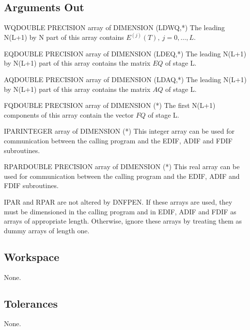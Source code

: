 \subsection{Arguments Out}

\begin{entry}{WQ}{DOUBLE PRECISION array of DIMENSION (LDWQ,*)}
    The leading N(L+1) by N part of this array contains
    $E^{(j)}(T),\ j=0,\dots,L$.
\end{entry}

\begin{entry}{EQ}{DOUBLE PRECISION array of DIMENSION (LDEQ,*)}
  The leading N(L+1) by N(L+1) part of this array contains the
  matrix $EQ$ of stage L.
\end{entry}

\begin{entry}{AQ}{DOUBLE PRECISION array of DIMENSION (LDAQ,*)}
  The leading N(L+1) by N(L+1) part of this array contains the
  matrix $AQ$ of stage L.
\end{entry}

\begin{entry}{FQ}{DOUBLE PRECISION array of DIMENSION (*)}
  The first N(L+1) components of this array contain the vector
  $FQ$ of stage L.
\end{entry}

\begin{entry}{IPAR}{INTEGER array of DIMENSION (*)}
  This integer array can be used for communication between the calling
  program and the EDIF, ADIF and FDIF subroutines.
\end{entry}

\begin{entry}{RPAR}{DOUBLE PRECISION array of DIMENSION (*)}
  This real array can be used for communication between the calling
  program and the EDIF, ADIF and FDIF subroutines.

  IPAR and RPAR are not altered by DNFPEN. If these arrays are used,
  they must be dimensioned in the calling program and in EDIF, ADIF
  and FDIF as arrays of appropriate length. Otherwise, ignore these
  arrays by treating them as dummy arrays of length one.
\end{entry}

\subsection{Workspace}
None.

\subsection{Tolerances}
None.

